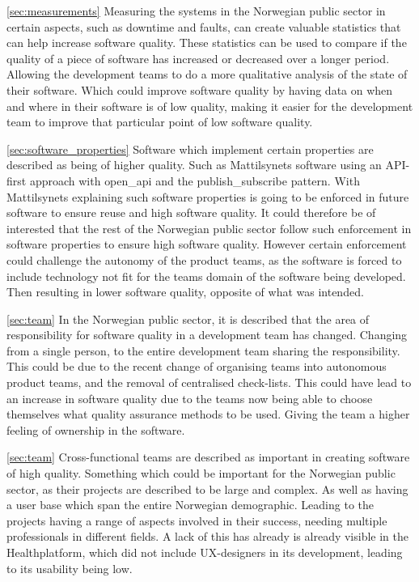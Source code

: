 \autoref{sec:measurements} Measuring the systems in the Norwegian public sector in certain aspects, such as downtime and faults, can create valuable statistics that can help increase software quality. These statistics can be used to compare if the quality of a piece of software has increased or decreased over a longer period. Allowing the development teams to do a more qualitative analysis of the state of their software. Which could improve software quality by having data on when and where in their software is of low quality, making it easier for the development team to improve that particular point of low software quality.

\autoref{sec:software_properties} Software which implement certain properties are described as being of higher quality. Such as Mattilsynets software using an API-first approach with \gls{open_api} and the \gls{publish_subscribe} pattern. With Mattilsynets explaining such software properties is going to be enforced in future software to ensure reuse and high software quality. It could therefore be of interested that the rest of the Norwegian public sector follow such enforcement in software properties to ensure high software quality. However certain enforcement could challenge the autonomy of the product teams, as the software is forced to include technology not fit for the teams domain of the software being developed. Then resulting in lower software quality, opposite of what was intended.

\autoref{sec:team} In the Norwegian public sector, it is described that the area of responsibility for software quality in a development team has changed. Changing from a single person, to the entire development team sharing the responsibility. This could be due to the recent change of organising teams into autonomous product teams, and the removal of centralised check-lists. This could have lead to an increase in software quality due to the teams now being able to choose themselves what quality assurance methods to be used. Giving the team a higher feeling of ownership in the software.

\autoref{sec:team} Cross-functional teams are described as important in creating software of high quality. Something which could be important for the Norwegian public sector, as their projects are described to be large and complex. As well as having a user base which span the entire Norwegian demographic. Leading to the projects having a range of aspects involved in their success, needing multiple professionals in different fields. A lack of this has already is already visible in the Healthplatform, which did not include UX-designers in its development, leading to its usability being low. 

